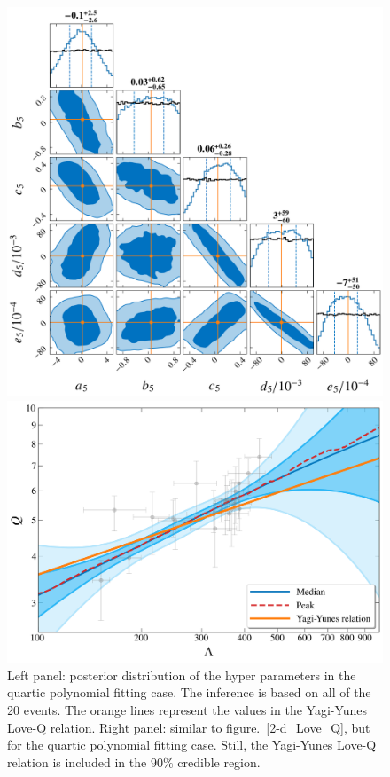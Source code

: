 \documentclass[a4paper,11pt]{article}
\begin{document}
\begin{figure}
\begin{minipage}[t]{0.49\textwidth}
\centering
\includegraphics[width=0.8\linewidth]{Hyper_parameter_5d.png}%
\end{minipage}
\hfill
\begin{minipage}[t]{0.49\textwidth}
\includegraphics[width=\linewidth]{hierarchical_results_AP4_5d.png}
\end{minipage}
\caption{\label{5-d_Love_Q} Left panel: posterior distribution of the hyper parameters in the quartic polynomial fitting case. 
    The inference is based on all of the 20 events. The orange lines represent the values in the Yagi-Yunes Love-Q relation. 
    Right panel: similar to figure.~\ref{2-d_Love_Q}, but for the quartic polynomial fitting case. 
    Still, the Yagi-Yunes Love-Q relation is included in the $90\%$ credible region.} 
\end{figure}
\end{document}
